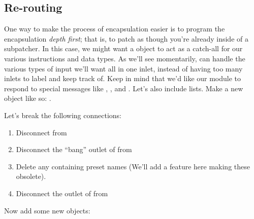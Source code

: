 \subsection{Re-routing}\label{re-routing}

One way to make the process of encapsulation easier is to program the encapsulation \emph{depth first}; that is, to patch as though you're already inside of a subpatcher.  In this case, we might want a  object to act as a catch-all for our various instructions and data types.  As we'll see momentarily,  can handle the various types of input we'll want all in one inlet, instead of having too many inlets to label and keep track of.  Keep in mind that we'd like our module to respond to special messages like , , and .  Let's also include lists.  Make a new object like so: .


Let's break the following connections:

\begin{enumerate}
\item Disconnect  from 
\item Disconnect the ``bang'' outlet of  from 
\item Delete any  containing preset names (We'll add a feature here making these obsolete).
\item Disconnect the outlet of  from 
\end{enumerate}

Now add some new objects:

